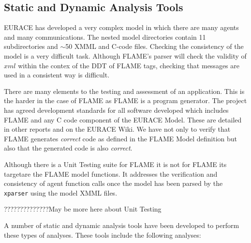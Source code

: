 
\subsection{Static and Dynamic Analysis Tools}

EURACE has developed a very complex model in which there are many agents and many communications. The nested model directories contain 11 subdirectories and $\sim$50 XMML and C-code files. Checking the consistency of the model is a very difficult task. Although FLAME's parser will check the validity of $xml$ within the contex of the DDT of FLAME tags, checking that messages are used in a consistent way is difficult.


There are many elements to the testing and assessment of an application. This is the harder in the case of FLAME as FLAME is a program generator. The project has agreed development standards for all software developed which includes FLAME and any C code component of the EURACE Model. These are detailed in other reports and on the EURACE Wiki. We have not only to verify that FLAME generates \textit{correct} code as defined in the FLAME Model definition but also that the generated code is also \textit{correct}.


Although there is a Unit Testing suite for FLAME it is not for FLAME its targetare the FLAME model functions. It addresses the verification and consistency of agent function calls once the model has been parsed by the \texttt{xparser} using the model XMML files.

??????????????May be more here about Unit Testing


A number of static and dynamic analysis tools have been developed to perform these types of analyses. These tools include the following analyses:

